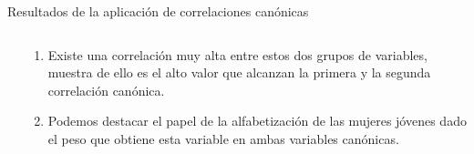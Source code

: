 \documentclass{beamer}
\begin{document}
\begin{frame}{Resultados de la aplicación de correlaciones canónicas}
\begin{columns}
\begin{column}{0.5\textwidth}
\end{column}

\begin{column}{0.5\textwidth}
\begin{footnotesize}
\begin{enumerate}
    \color{red}
    \item Existe una correlación muy alta entre estos dos grupos de variables, muestra de ello es el alto valor que alcanzan la primera y la segunda correlación canónica.
    \item Podemos destacar el papel de la alfabetización de las mujeres jóvenes dado el peso que obtiene esta variable en ambas variables canónicas.
\end{enumerate}
\end{footnotesize}
\end{column}

\end{columns}

\end{frame}
\end{document}
